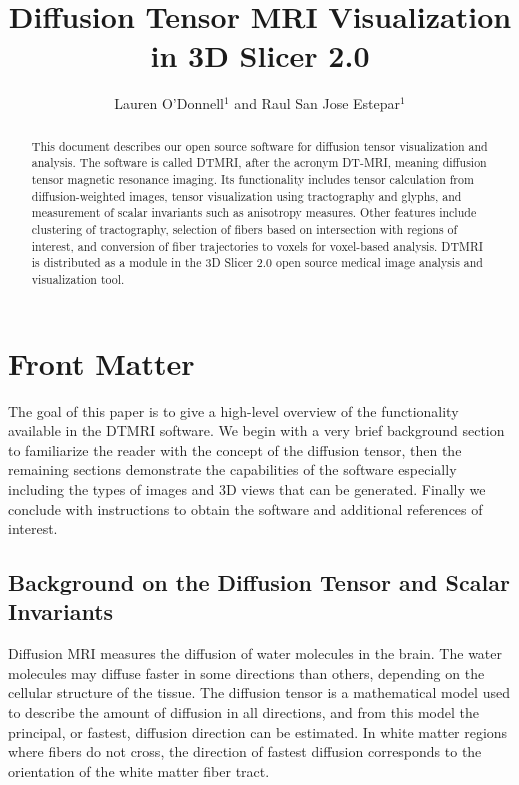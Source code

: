 \documentclass{InsightArticle}
\title{Diffusion Tensor MRI Visualization in 3D Slicer 2.0}
\author{Lauren O'Donnell$^{1}$ and Raul San Jose Estepar$^{1}$}
\begin{document}
\ifpdf
\else
\fi


\maketitle


\ifhtml
\chapter*{Front Matter\label{front}}
\fi


\begin{abstract}
\noindent
This document describes our open source software for diffusion tensor
visualization and analysis.  The software is called DTMRI, after the
acronym DT-MRI, meaning diffusion tensor magnetic resonance imaging.
Its functionality includes tensor calculation from diffusion-weighted
images, tensor visualization using tractography and glyphs, and
measurement of scalar invariants such as anisotropy measures.  Other
features include clustering of tractography, selection of fibers based
on intersection with regions of interest, and conversion of fiber
trajectories to voxels for voxel-based analysis.  DTMRI is distributed
as a module in the 3D Slicer 2.0 open source medical image analysis
and visualization tool.

\end{abstract}

\tableofcontents

The goal of this paper is to give a high-level overview of the
functionality available in the DTMRI software.  We begin with a very
brief background section to familiarize the reader with the concept of
the diffusion tensor, then the remaining sections demonstrate the
capabilities of the software especially including the types of images
and 3D views that can be generated.  Finally we conclude with
instructions to obtain the software and additional references of
interest.


\section{Background on the Diffusion Tensor and Scalar Invariants}
Diffusion MRI measures the diffusion of water molecules in the brain.
The water molecules may diffuse faster in some directions than others,
depending on the cellular structure of the tissue. The diffusion
tensor is a mathematical model used to describe the amount of
diffusion in all directions, and from this model the principal, or
fastest, diffusion direction can be estimated. In white matter regions
where fibers do not cross, the direction of fastest diffusion
corresponds to the orientation of the white matter fiber tract.
\end{document}
